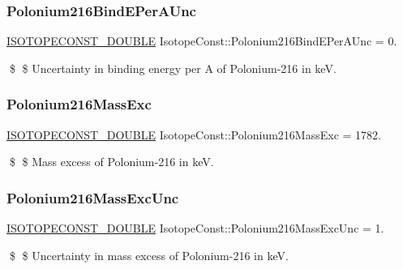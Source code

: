 \subsubsection{\texorpdfstring{Polonium216\+Bind\+E\+Per\+A\+Unc}{Polonium216BindEPerAUnc}}
{\footnotesize\ttfamily \mbox{\hyperlink{group___isotope_const-_macros_ga8f45a7272ce02c0b4c65c44636ed719a}{I\+S\+O\+T\+O\+P\+E\+C\+O\+N\+S\+T\+\_\+\+D\+O\+U\+B\+LE}} Isotope\+Const\+::\+Polonium216\+Bind\+E\+Per\+A\+Unc = 0.}

\$ \$ Uncertainty in binding energy per A of Polonium-\/216 in keV. \mbox{\label{group___isotope_const-_polonium-_po216_ga10c9364a3d03337589c16ebc598a563e}} 
\subsubsection{\texorpdfstring{Polonium216\+Mass\+Exc}{Polonium216MassExc}}
{\footnotesize\ttfamily \mbox{\hyperlink{group___isotope_const-_macros_ga8f45a7272ce02c0b4c65c44636ed719a}{I\+S\+O\+T\+O\+P\+E\+C\+O\+N\+S\+T\+\_\+\+D\+O\+U\+B\+LE}} Isotope\+Const\+::\+Polonium216\+Mass\+Exc = 1782.}

\$ \$ Mass excess of Polonium-\/216 in keV. \mbox{\label{group___isotope_const-_polonium-_po216_ga5d1dbf5f51ebc1f9bfc5741aba793bae}} 
\subsubsection{\texorpdfstring{Polonium216\+Mass\+Exc\+Unc}{Polonium216MassExcUnc}}
{\footnotesize\ttfamily \mbox{\hyperlink{group___isotope_const-_macros_ga8f45a7272ce02c0b4c65c44636ed719a}{I\+S\+O\+T\+O\+P\+E\+C\+O\+N\+S\+T\+\_\+\+D\+O\+U\+B\+LE}} Isotope\+Const\+::\+Polonium216\+Mass\+Exc\+Unc = 1.}

\$ \$ Uncertainty in mass excess of Polonium-\/216 in keV. \mbox{\label{group___isotope_const-_polonium-_po216_gaae998a95381bf7c5750ac6762116404f}} 

